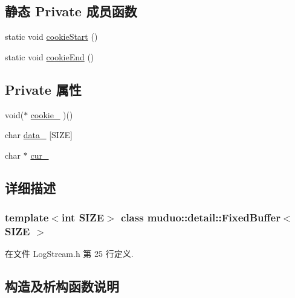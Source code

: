\subsection*{静态 Private 成员函数}
\begin{DoxyCompactItemize}
\item 
static void \hyperlink{classmuduo_1_1detail_1_1FixedBuffer_a64d4d2d5b107798f469956cd12405b84}{cookie\+Start} ()
\item 
static void \hyperlink{classmuduo_1_1detail_1_1FixedBuffer_a6340e2e9c0b269ff97b1ffa43dfb2920}{cookie\+End} ()
\end{DoxyCompactItemize}
\subsection*{Private 属性}
\begin{DoxyCompactItemize}
\item 
void($\ast$ \hyperlink{classmuduo_1_1detail_1_1FixedBuffer_a5684debf5a7e739505cba6c024a3f7f8}{cookie\+\_\+} )()
\item 
char \hyperlink{classmuduo_1_1detail_1_1FixedBuffer_a54258af31252262daa68a893089d7a88}{data\+\_\+} \mbox{[}S\+I\+ZE\mbox{]}
\item 
char $\ast$ \hyperlink{classmuduo_1_1detail_1_1FixedBuffer_ad1ee918c4fe42ae1767d186beebf9778}{cur\+\_\+}
\end{DoxyCompactItemize}


\subsection{详细描述}
\subsubsection*{template$<$int S\+I\+ZE$>$\newline
class muduo\+::detail\+::\+Fixed\+Buffer$<$ S\+I\+Z\+E $>$}



在文件 Log\+Stream.\+h 第 25 行定义.



\subsection{构造及析构函数说明}
\mbox{\label{classmuduo_1_1detail_1_1FixedBuffer_a6722d84d94a517c4b7152df4491d474f}} 
